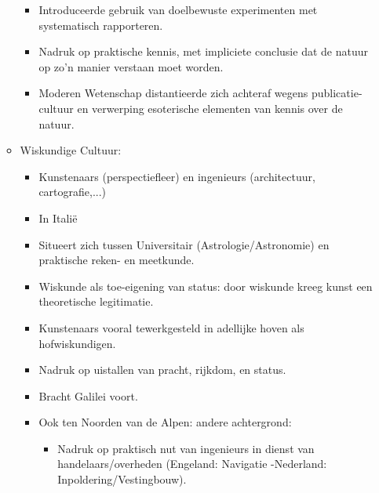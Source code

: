 \documentclass{article}
\begin{document}
\begin{itemize}
\begin{itemize}
\begin{itemize}
          \item Introduceerde gebruik van doelbewuste experimenten met systematisch rapporteren.
          \item Nadruk op praktische kennis, met impliciete conclusie dat de natuur op zo'n manier verstaan moet worden.
          \item Moderen Wetenschap distantieerde zich achteraf wegens publicatie-cultuur en verwerping esoterische elementen van kennis over de natuur.
        \end{itemize}
        \item Wiskundige Cultuur:
        \begin{itemize}
          \item Kunstenaars (perspectiefleer) en ingenieurs (architectuur, cartografie,...)
          \item In Itali\"e
          \item Situeert zich tussen Universitair (Astrologie/Astronomie) en praktische reken- en meetkunde.
          \item Wiskunde als toe-eigening van status: door wiskunde kreeg kunst een theoretische legitimatie.
          \item Kunstenaars vooral tewerkgesteld in adellijke hoven als hofwiskundigen.
          \item Nadruk op uistallen van pracht, rijkdom, en status.
          \item Bracht Galilei voort.
          \item Ook ten Noorden van de Alpen: andere achtergrond:
          \begin{itemize}
            \item Nadruk op praktisch nut van ingenieurs in dienst van handelaars/overheden (Engeland: Navigatie -Nederland: Inpoldering/Vestingbouw).
          \end{itemize} 
        \end{itemize}
      \end{itemize}
    \end{itemize}

  \newpage
\end{document}
